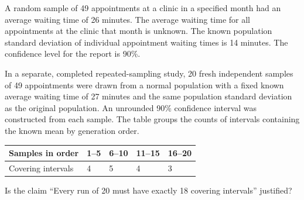 \clearpage
{}
A random sample of 49 appointments at a clinic in a specified month had an average waiting time of 26 minutes. The average waiting time for all appointments at the clinic that month is unknown. The known population standard deviation of individual appointment waiting times is 14 minutes. The confidence level for the report is 90\%.

In a separate, completed repeated-sampling study, 20 fresh independent samples of 49 appointments were drawn from a normal population with a fixed known average waiting time of 27 minutes and the same population standard deviation as the original population. An unrounded 90\% confidence interval was constructed from each sample. The table groups the counts of intervals containing the known mean by generation order.

\begin{center}\begin{tabular}{@{}lllll@{}}\toprule
Samples in order & 1--5 & 6--10 & 11--15 & 16--20\\\midrule
Covering intervals & 4 & 5 & 4 & 3\\
\bottomrule\end{tabular}\end{center}


\BlankInformationTable
\clearpage
{}

Is the claim ``Every run of 20 must have exactly 18 covering intervals'' justified?
\vfill

